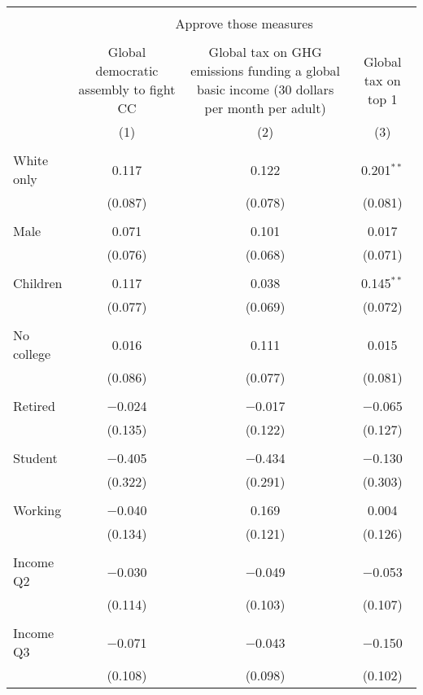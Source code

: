 
\begin{tabular}{@{\extracolsep{5pt}}lccc} 
\\[-1.8ex]\hline 
\hline \\[-1.8ex] 
 & \multicolumn{3}{c}{Approve those measures} \\ 
\cline{2-4} 
\\[-1.8ex] & Global democratic assembly to fight CC & Global tax on GHG emissions funding a global basic income (30 dollars per month per adult) & Global tax on top 1%
\\[-1.8ex] & (1) & (2) & (3)\\ 
\hline \\[-1.8ex] 
 White only & 0.117 & 0.122 & 0.201$^{**}$ \\ 
  & (0.087) & (0.078) & (0.081) \\ 
  & & & \\ 
 Male & 0.071 & 0.101 & 0.017 \\ 
  & (0.076) & (0.068) & (0.071) \\ 
  & & & \\ 
 Children & 0.117 & 0.038 & 0.145$^{**}$ \\ 
  & (0.077) & (0.069) & (0.072) \\ 
  & & & \\ 
 No college & 0.016 & 0.111 & 0.015 \\ 
  & (0.086) & (0.077) & (0.081) \\ 
  & & & \\ 
 Retired & $-$0.024 & $-$0.017 & $-$0.065 \\ 
  & (0.135) & (0.122) & (0.127) \\ 
  & & & \\ 
 Student & $-$0.405 & $-$0.434 & $-$0.130 \\ 
  & (0.322) & (0.291) & (0.303) \\ 
  & & & \\ 
 Working & $-$0.040 & 0.169 & 0.004 \\ 
  & (0.134) & (0.121) & (0.126) \\ 
  & & & \\ 
 Income Q2 & $-$0.030 & $-$0.049 & $-$0.053 \\ 
  & (0.114) & (0.103) & (0.107) \\ 
  & & & \\ 
 Income Q3 & $-$0.071 & $-$0.043 & $-$0.150 \\ 
  & (0.108) & (0.098) & (0.102) \\ 

\end{tabular}
